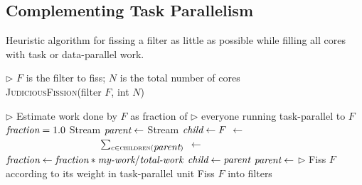 \subsection{Complementing Task Parallelism}

\begin{algorithm}[t]
\caption{Heuristic algorithm for fissing a filter as little as
possible while filling all cores with task or data-parallel
work. \label{fig:judicious-fission}}
{$\triangleright$ $F$ is the filter to fiss; $N$ is the total number of cores\\
\textsc{JudiciousFission}(filter $F$, int $N$)}
\begin{algorithmic}
\Statex $\triangleright$ Estimate work done by $F$ as fraction of
\Statex $\triangleright$ everyone running task-parallel to $F$
\State $\mbox{\it fraction} = 1.0$
\State Stream $\mbox{\it parent} \gets$ 
\State Stream $\mbox{\it child}  \gets F$
		\State {} $\gets$ \\
\ \ \ \ \ \ \ \ \ \ \ \ \ \  \ \ \ \ \  $\sum_{c \in \textsc{children}(\mbox{\it parent})}$ 
		\State {} $ \gets $ 
		\State $\mbox{\it fraction} \gets \mbox{\it fraction} * \mbox{\it my-work} /
\mbox{\it total-work}$
	\EndIf
	\State $\mbox{\it child} \gets \mbox{\it parent}$
	\State $\mbox{\it parent} \gets $ 
\EndWhile
\Statex $\triangleright$ Fiss $F$ according to its weight in task-parallel unit
\State Fiss $F$ into  filters
\end{algorithmic}
\end{algorithm}


